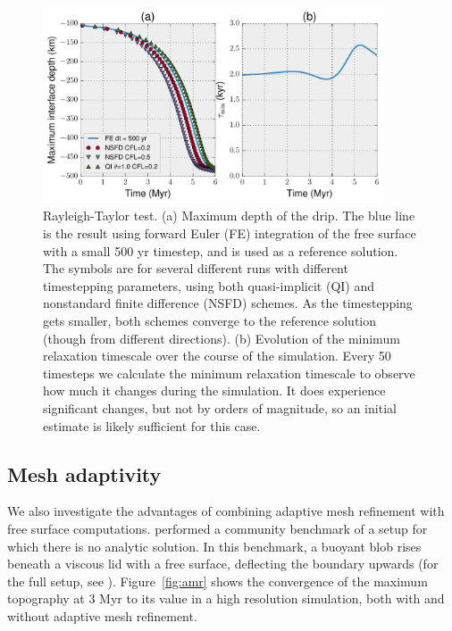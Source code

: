 \documentclass[preprint,12pt,authoryear]{elsarticle}
\begin{document}
\begin{figure}
\includegraphics[width=0.9\textwidth]{figures/rayleigh_taylor.pdf}
\caption{Rayleigh-Taylor test. (a) Maximum depth of the drip. The blue line is the result using forward Euler (FE) integration of the free surface with a small 500 yr timestep, and is used as a reference solution. The symbols are for several different runs with different timestepping parameters, using both quasi-implicit (QI) and nonstandard finite difference (NSFD) schemes. As the timestepping gets smaller, both schemes converge to the reference solution (though from different directions). (b) Evolution of the minimum relaxation timescale over the course of the simulation. Every 50 timesteps we calculate the minimum relaxation timescale to observe how much it changes during the simulation. It does experience significant changes, but not by orders of magnitude, so an initial estimate is likely sufficient for this case.}
\label{fig:rayleigh_taylor}
\end{figure}


\subsection{Mesh adaptivity}
\label{sec:mesh_adaptivity}

We also investigate the advantages of combining adaptive mesh refinement with free surface computations.
\citet{crameri2012comparison} performed a community benchmark of a setup for which there is no analytic
solution. In this benchmark, a buoyant blob rises beneath a viscous lid with a free surface, deflecting the
boundary upwards (for the full setup, see \citet{crameri2012comparison}). 
Figure~\ref{fig:amr} shows the convergence of the maximum topography at 3 Myr to its value in a high resolution simulation,
both with and without adaptive mesh refinement.
\end{document}
